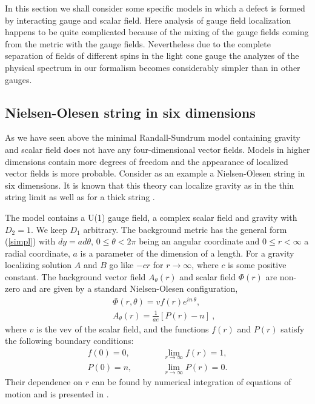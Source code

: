 \documentclass[a4paper,12pt]{article}
\begin{document}
In this section we shall consider some specific models in which a
defect is formed by interacting gauge and scalar field. Here
analysis of gauge field localization happens to be quite
complicated because of the mixing of the gauge fields coming from
the metric with the gauge fields. Nevertheless due to the complete
separation of fields of different spins in the light cone gauge
the analyzes of the physical spectrum in our formalism  becomes
considerably simpler than in other gauges.

\subsection{Nielsen-Olesen string in six dimensions}
As we have seen above the minimal Randall-Sundrum model  containing
gravity and scalar field does not have any four-dimensional vector
fields. Models in higher dimensions contain more degrees of freedom
and the appearance of localized vector fields is more probable.
Consider as an example a Nielsen-Olesen string in six dimensions. It
is known that this theory can localize gravity as in the thin string
limit \cite{Gherghetta:2000qi} as well as for a thick string
\cite{Giovannini:2001hh}.

The model contains a U(1) gauge field, a complex scalar field and
gravity with $D_2=1$.  We keep $D_1$ arbitrary. The background
metric has the general form (\ref{simpl}) with $dy= a d\theta$,
$0\leq\theta<2\pi$ being an  angular coordinate and $0\leq r
<\infty$  a radial coordinate, $a$ is a parameter of the dimension
of a length. For a gravity localizing solution $A$ and $B$ go like
$-cr$ for $r \to \infty$, where $c$ is some positive constant. The
background vector field $A_\theta(r) $ and scalar field $\Phi(r)$
are non-zero and are given by a standard Nielsen-Olesen
configuration,
\begin{eqnarray}
&& \Phi(r,\theta) =v f(r)e^{in\,\theta},
\nonumber\\
&&A_{\theta}(r)  =\frac{1}{a e}[P(r)-n] ~, 
\label{NO}
\end{eqnarray}
where $v$ is the vev of the scalar field, and the functions $f(r)$
and $P(r)$ satisfy the following boundary conditions:
\begin{eqnarray}
f(0)=0,&\qquad& \lim_{r\rightarrow \infty} f(r)=1,
\nonumber\\
P(0)=n,&\qquad& \lim_{r\rightarrow \infty} P(r)=0.
\label{boundary}
\end{eqnarray}
Their dependence on $r$ can be found by numerical integration of
equations of motion and is presented in \cite{Giovannini:2001hh}.
\end{document}
